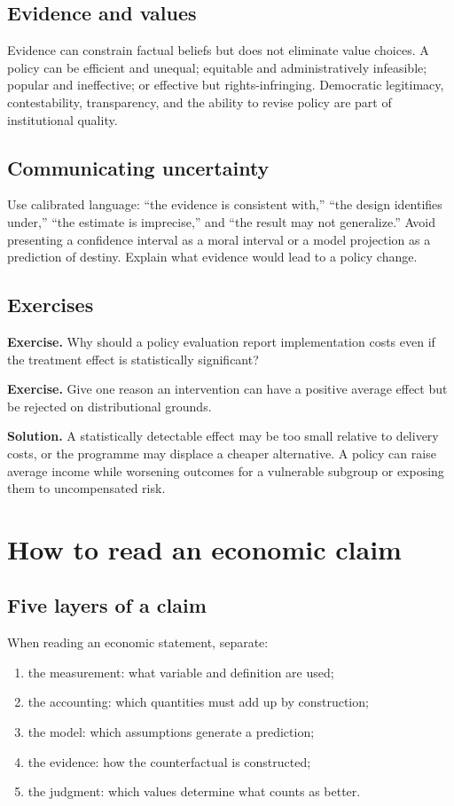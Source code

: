 \documentclass[11pt,oneside,openany]{book}
\newcommand{\exercise}[1]{\textbf{Exercise.} #1}
\newcommand{\solution}[1]{\textbf{Solution.} #1}
\begin{document}
\section{Evidence and values}

Evidence can constrain factual beliefs but does not eliminate value choices. A policy can be efficient and unequal; equitable and administratively infeasible; popular and ineffective; or effective but rights-infringing. Democratic legitimacy, contestability, transparency, and the ability to revise policy are part of institutional quality.

\section{Communicating uncertainty}

Use calibrated language: ``the evidence is consistent with,'' ``the design identifies under,'' ``the estimate is imprecise,'' and ``the result may not generalize.'' Avoid presenting a confidence interval as a moral interval or a model projection as a prediction of destiny. Explain what evidence would lead to a policy change.

\section{Exercises}

\exercise{Why should a policy evaluation report implementation costs even if the treatment effect is statistically significant?}

\exercise{Give one reason an intervention can have a positive average effect but be rejected on distributional grounds.}

\solution{A statistically detectable effect may be too small relative to delivery costs, or the programme may displace a cheaper alternative. A policy can raise average income while worsening outcomes for a vulnerable subgroup or exposing them to uncompensated risk.}

\chapter{How to read an economic claim}
\label{ch:reading}

\section{Five layers of a claim}

When reading an economic statement, separate:
\begin{enumerate}
  \item the measurement: what variable and definition are used;
  \item the accounting: which quantities must add up by construction;
  \item the model: which assumptions generate a prediction;
  \item the evidence: how the counterfactual is constructed;
  \item the judgment: which values determine what counts as better.
\end{enumerate}
\end{document}
